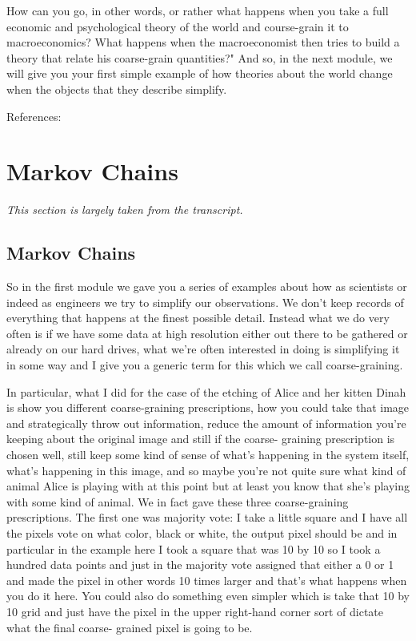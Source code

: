 \documentclass[]{article}
\begin{document}
How can you go, in other words, or rather what happens when you take
a full economic and psychological theory of the world
and course-grain it to macroeconomics? What happens when the macroeconomist
then tries to build a theory that relate his coarse-grain quantities?"
And so, in the next module, we will give you your first simple example
of how theories about the world change when the objects
that they describe simplify.

References: \cite{dedeo2018information,dedeo2013bootstrap,dedeo201716}

\section{Markov Chains}

\textit{This section is largely taken from the transcript.}

\subsection{Markov Chains}

So in the first module we gave you a series of examples about how as
scientists or indeed as engineers we try to simplify our observations. We don't
keep records of everything that happens at the finest possible detail. Instead
what we do very often is if we have some data at high resolution either out there
to be gathered or already on our hard drives, what we're often interested in
doing is simplifying it in some way and I give you a generic term for this which
we call coarse-graining.

In particular, what I did for the case of the etching
of Alice and her kitten Dinah is show you different coarse-graining
prescriptions, how you could take that image and strategically throw out
information, reduce the amount of
information you're keeping about the
original image and still if the coarse-
graining prescription is chosen well,
still keep some kind of sense of what's
happening in the system itself, what's
happening in this image, and so  maybe
you're not quite sure what kind of
animal Alice is playing with at this
point but at least you know that she's
playing with some kind of animal. We in
fact gave these three coarse-graining
prescriptions. The first one was majority
vote: I take a little square and I have
all the pixels vote on what color, black
or white, the output pixel should be and
in particular in the example here I took
a square that was 10 by 10 so I took a
hundred data points and just in the
majority vote assigned that either a 0
or 1 and made the pixel in other words
10 times larger and that's what happens
when you do it here. You could also do
something even simpler which is take
that 10 by 10 grid and just have the
pixel in the upper right-hand corner
sort of dictate what the final coarse-
grained pixel is going to be.
\end{document}
